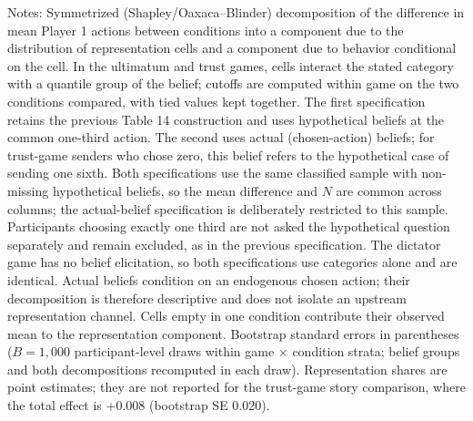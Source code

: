 \begin{table}[!htbp]
\begin{flushleft}
\footnotesize Notes: Symmetrized (Shapley/Oaxaca--Blinder) decomposition of the difference in mean Player 1 actions between conditions into a component due to the distribution of representation cells and a component due to behavior conditional on the cell. In the ultimatum and trust games, cells interact the stated category with a quantile group of the belief; cutoffs are computed within game on the two conditions compared, with tied values kept together. The first specification retains the previous Table 14 construction and uses hypothetical beliefs at the common one-third action. The second uses actual (chosen-action) beliefs; for trust-game senders who chose zero, this belief refers to the hypothetical case of sending one sixth. Both specifications use the same classified sample with non-missing hypothetical beliefs, so the mean difference and $N$ are common across columns; the actual-belief specification is deliberately restricted to this sample. Participants choosing exactly one third are not asked the hypothetical question separately and remain excluded, as in the previous specification. The dictator game has no belief elicitation, so both specifications use categories alone and are identical. Actual beliefs condition on an endogenous chosen action; their decomposition is therefore descriptive and does not isolate an upstream representation channel. Cells empty in one condition contribute their observed mean to the representation component. Bootstrap standard errors in parentheses ($B=1{,}000$ participant-level draws within game $\times$ condition strata; belief groups and both decompositions recomputed in each draw). Representation shares are point estimates; they are not reported for the trust-game story comparison, where the total effect is +0.008 (bootstrap SE 0.020).
\end{flushleft}
\end{table}
